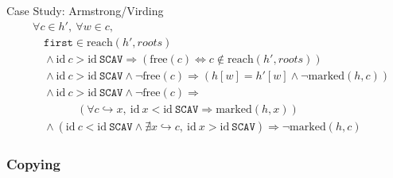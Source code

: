 \documentclass[usenames,dvipsnames]{beamer}
\renewcommand{\iff}{\Leftrightarrow}
\renewcommand{\implies}{\Rightarrow}
\newcommand{\pointsto}{\hookrightarrow}
\newcommand{\reach}[2]{\mathrm{reach}\left(#1, #2\right)}
\newcommand{\id}{\mathrm{id}}
\newcommand{\free}[1]{\mathrm{free}\left(#1\right)}
\newcommand{\marked}[2]{\mathrm{marked}\left(#1, #2\right)}
\begin{document}
\begin{frame}[fragile]{Case Study: Armstrong/Virding}
  \begin{align*}
    &\forall c \in h',\ \forall w \in c,\\
    &\quad\mathtt{first} \in\reach{h'}{roots}\\
%
    &\quad\land \id~c > \id~\mathtt{SCAV} \implies (\free{c}
      \iff c \notin \reach{h'}{roots})\\
%
    &\quad\land \id~c > \id~\mathtt{SCAV} \land \lnot\free{c}
      \implies (h[w] = h'[w] \land \lnot \marked{h}{c})\\
%
    &\quad\land \id~c > \id~\mathtt{SCAV} \land \lnot\free{c}
      \implies\\
      &\quad\quad\quad\quad(\forall c \pointsto x,\ \id~x <
      \id~\mathtt{SCAV} \implies \marked{h}{x})\\
%
    &\quad\land \left(\id~c < \id~\mathtt{SCAV} \land \nexists x \pointsto
      c,\ \id~x > \id~\mathtt{SCAV}\right) \implies \lnot\marked{h}{c}
  \end{align*}





\end{frame}

\subsubsection{Copying}
\end{document}
